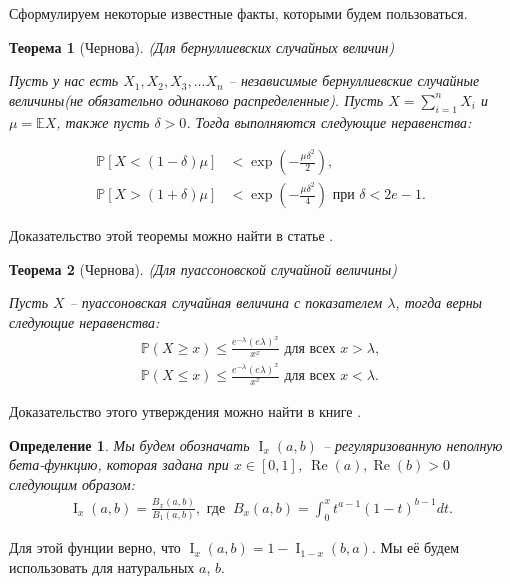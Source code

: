 \documentclass{matmex-diploma-custom}
\newcommand{\Expect}{\mathbb E}
\newcommand{\PRob}{\mathbb P}
\newcommand{\leqs}{\leqslant}
\newcommand{\geqs}{\geqslant}
\DeclareMathOperator{\re}{Re}
\DeclareMathOperator{\I}{I}
\newtheorem{define}{Определение}
\theoremstyle{named}
\newtheorem*{namedtheorem}{Теорема}
\begin{document}
Сформулируем некоторые известные факты, которыми будем пользоваться.



\begin{namedtheorem}[Чернова] (Для бернуллиевских случайных величин) \label{Cher} 

Пусть у нас есть $X_1, X_2, X_3, \dots X_n$ -- 
независимые бернуллиевские случайные величины(не обязательно одинаково распределенные). Пусть $X = \sum\limits_{i = 1}^n X_i$ и
$\mu = \Expect X$, также пусть $\delta > 0$. Тогда выполняются следующие неравенства:

\begin{align}\label{ch_1}
\PRob[X < (1-\delta)\mu] &< \exp\left(- \frac{\mu \delta^2}{2} \right),
\\\label{ch_2}
\PRob[X > (1+\delta)\mu] &< \exp\left(- \frac{\mu \delta^2}{4} \right) \text{ при } \delta < 2e - 1.
\end{align}
\end{namedtheorem}
Доказательство этой теоремы можно найти в статье \cite{chernov}.

\begin{namedtheorem}[Чернова] (Для пуассоновской случайной величины)

Пусть $X$ -- пуассоновская случайная величина с показателем $\lambda$, тогда верны следующие неравенства:
\begin{align} \label{gr_1}
\PRob(X \geqs x) \leqs \frac{e^{-\lambda}(e\lambda)^x}{x^x} \text{ для всех } x > \lambda,
\\
\label{gr_2}
\PRob(X \leqs x) \leqs \frac{e^{-\lambda}(e\lambda)^x}{x^x} \text{ для всех } x < \lambda.
\end{align}
\end{namedtheorem}
Доказательство этого утверждения можно найти в книге \cite{chernov_gr}.

\medskip

\begin{define}
Мы будем обозначать $\I_x(a,b)$ -- регуляризованную неполную бета-функцию, 
которая задана при $x \in [0,1]$, $\re(a), \re(b) > 0$ следующим образом:
\begin{equation} \label{i_x} \begin{aligned}
\I_x(a,b) = \frac{B_x(a,b)}{B_1(a,b)}, \text{ где }~ 
B_x(a,b) = \int_0^x t^{a-1} (1-t)^{b-1} dt.
\end{aligned}\end{equation}
\end{define}
Для этой фунции верно, что $\I_x(a,b) = 1 - \I_{1-x}(b, a)$.
Мы её будем использовать для натуральных $a$, $b$.
\end{document}
